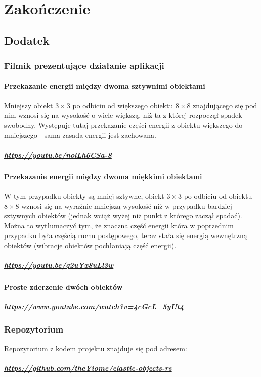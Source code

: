 \documentclass[12pt, letterpaper]{report}
\begin{document}
\chapter{Zakończenie}
    \section{Dodatek}

    \subsection{Filmik prezentujące działanie aplikacji}

    \subsubsection{Przekazanie energii między dwoma sztywnimi obiektami}

    Mniejszy obiekt $3 \times 3$ po odbiciu od większego obiektu $8 \times  8$ znajdującego się pod nim wznosi się na
    wysokość o wiele większą, niż ta z której rozpoczął spadek swobodny.
    Występuje tutaj przekazanie części energii z obiektu większego do mniejszego - sama zasada energii jest zachowana.

    \paragraph{
        \url{https://youtu.be/nolLh6CSa-8}
    }

    \subsubsection{Przekazanie energii między dwoma miękkimi obiektami}
    W tym przypadku obiekty są mniej sztywne,
    obiekt $3 \times 3$ po odbiciu od obiektu $8 \times  8$ wznosi się na wyraźnie mniejszą wysokość niż w przypadku bardziej sztywnych obiektów
    (jednak wciąż wyżej niż punkt z którego zaczął spadać). Można to wytłumaczyć tym,
    że znaczna część energii która w poprzednim przypadku była częścią ruchu postępowego,
    teraz stała się energią wewnętrzną obiektów (wibracje obiektów pochłaniają część energii).

    \paragraph{
        \url{https://youtu.be/q2uYx8uLl3w}
    }

    \subsubsection{Proste zderzenie dwóch obiektów}
    \paragraph{
        \url{https://www.youtube.com/watch?v=4cGcL_5yUt4}
    }

    \subsection{Repozytorium}
    Repozytorium z kodem projektu znajduje się pod adresem:
    \paragraph{
        \url{https://github.com/theYiome/elastic-objects-rs}
}
\end{document}
